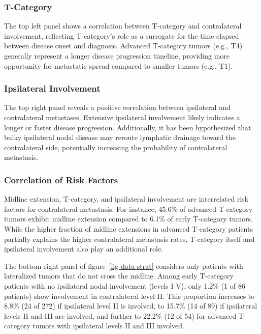 \documentclass[
  sn-mathphys-num,
]{sn-jnl}
\begin{document}
\subsubsection{T-Category}\label{t-category}

The top left panel shows a correlation between T-category and
contralateral involvement, reflecting T-category's role as a surrogate
for the time elapsed between disease onset and diagnosis. Advanced
T-category tumors (e.g., T4) generally represent a longer disease
progression timeline, providing more opportunity for metastatic spread
compared to smaller tumors (e.g., T1).

\subsubsection{Ipsilateral Involvement}\label{ipsilateral-involvement}

The top right panel reveals a positive correlation between ipsilateral
and contralateral metastases. Extensive ipsilateral involvement likely
indicates a longer or faster disease progression. Additionally, it has
been hypothesized that bulky ipsilateral nodal disease may reroute
lymphatic drainage toward the contralateral side, potentially increasing
the probability of contralateral metastasis.

\subsubsection{Correlation of Risk
Factors}\label{correlation-of-risk-factors}

Midline extension, T-category, and ipsilateral involvement are
interrelated risk factors for contralateral metastasis. For instance,
45.6\% of advanced T-category tumors exhibit midline extension compared
to 6.1\% of early T-category tumors. While the higher fraction of
midline extensions in advanced T-category patients partially explains
the higher contralateral metastasis rates, T-category itself and
ipsilateral involvement also play an additional role.

The bottom right panel of figure~\ref{fig-data-strat} considers only
patients with lateralized tumors that do not cross the midline. Among
early T-category patients with no ipsilateral nodal involvement (levels
I-V), only 1.2\% (1 of 86 patients) show involvement in contralateral
level II. This proportion increases to 8.8\% (24 of 272) if ipsilateral
level II is involved, to 15.7\% (14 of 89) if ipsilateral levels II and
III are involved, and further to 22.2\% (12 of 54) for advanced
T-category tumors with ipsilateral levels II and III involved.
\end{document}
